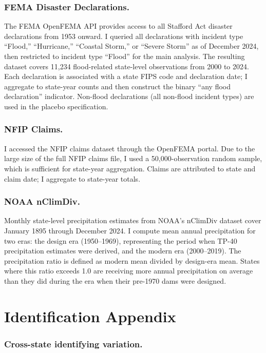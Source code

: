 \documentclass[12pt]{article}
\begin{document}
\subsubsection*{FEMA Disaster Declarations.}

The FEMA OpenFEMA API provides access to all Stafford Act disaster declarations from 1953 onward. I queried all declarations with incident type ``Flood,'' ``Hurricane,'' ``Coastal Storm,'' or ``Severe Storm'' as of December 2024, then restricted to incident type ``Flood'' for the main analysis. The resulting dataset covers 11,234 flood-related state-level observations from 2000 to 2024. Each declaration is associated with a state FIPS code and declaration date; I aggregate to state-year counts and then construct the binary ``any flood declaration'' indicator. Non-flood declarations (all non-flood incident types) are used in the placebo specification.

\subsubsection*{NFIP Claims.}

I accessed the NFIP claims dataset through the OpenFEMA portal. Due to the large size of the full NFIP claims file, I used a 50,000-observation random sample, which is sufficient for state-year aggregation. Claims are attributed to state and claim date; I aggregate to state-year totals.

\subsubsection*{NOAA nClimDiv.}

Monthly state-level precipitation estimates from NOAA's nClimDiv dataset \citep{noaa2015} cover January 1895 through December 2024. I compute mean annual precipitation for two eras: the design era (1950--1969), representing the period when TP-40 precipitation estimates were derived, and the modern era (2000--2019). The precipitation ratio is defined as modern mean divided by design-era mean. States where this ratio exceeds 1.0 are receiving more annual precipitation on average than they did during the era when their pre-1970 dams were designed.

\section{Identification Appendix}

\subsubsection*{Cross-state identifying variation.}
\end{document}
